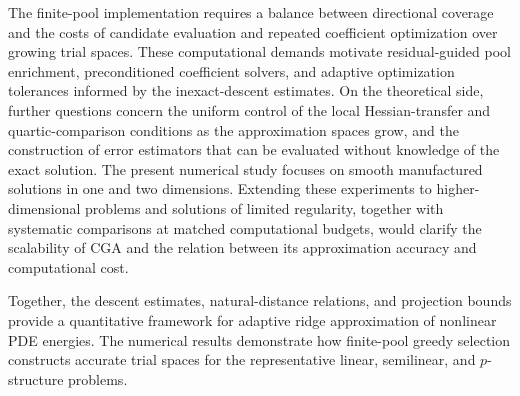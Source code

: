 The finite-pool implementation requires a balance between directional coverage and the costs of candidate evaluation and repeated coefficient optimization over growing trial spaces. These computational demands motivate residual-guided pool enrichment, preconditioned coefficient solvers, and adaptive optimization tolerances informed by the inexact-descent estimates. On the theoretical side, further questions concern the uniform control of the local Hessian-transfer and quartic-comparison conditions as the approximation spaces grow, and the construction of error estimators that can be evaluated without knowledge of the exact solution. The present numerical study focuses on smooth manufactured solutions in one and two dimensions. Extending these experiments to higher-dimensional problems and solutions of limited regularity, together with systematic comparisons at matched computational budgets, would clarify the scalability of CGA and the relation between its approximation accuracy and computational cost.

Together, the descent estimates, natural-distance relations, and projection bounds provide a quantitative framework for adaptive ridge approximation of nonlinear PDE energies. The numerical results demonstrate how finite-pool greedy selection constructs accurate trial spaces for the representative linear, semilinear, and \(p\)-structure problems.
